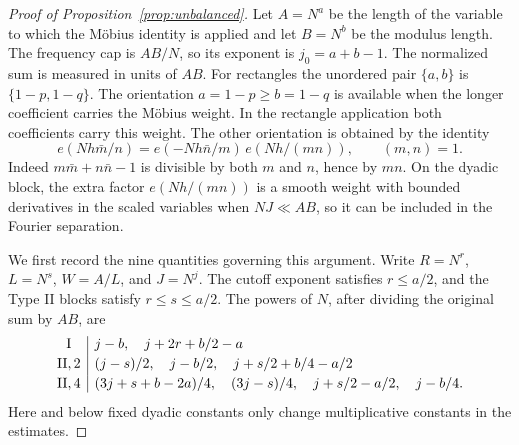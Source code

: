 \documentclass[11pt]{amsart}
\numberwithin{equation}{section}
\theoremstyle{remark}
\begin{document}
\begin{proof}[Proof of Proposition~\ref{prop:unbalanced}]
Let \(A=N^a\) be the length of the variable to which the M\"obius
identity is applied and let \(B=N^b\) be the modulus length. The
frequency cap is \(AB/N\), so its exponent is \(j_0=a+b-1\).
The normalized sum is measured in units of \(AB\).
For rectangles the unordered pair \(\{a,b\}\) is
\(\{1-p,1-q\}\). The orientation \(a=1-p\ge b=1-q\) is available
when the longer coefficient carries the M\"obius weight. In the
rectangle application both coefficients carry this weight.
The other orientation is obtained by the identity
\[
 e(Nh\bar m/n)=e(-Nh\bar n/m)\,e(Nh/(mn)),\qquad (m,n)=1.
\]
Indeed \(m\bar m+n\bar n-1\) is divisible by both \(m\) and \(n\),
hence by \(mn\). On the dyadic block, the extra factor \(e(Nh/(mn))\)
is a smooth weight with bounded derivatives in the scaled variables
when \(NJ\ll AB\), so it can be included in the Fourier separation.

We first record the nine quantities governing this argument. Write
\(R=N^r\), \(L=N^s\), \(W=A/L\), and \(J=N^j\).
The cutoff exponent satisfies \(r\le a/2\), and the Type II blocks
satisfy \(r\le s\le a/2\).
The powers of \(N\), after dividing the original sum by \(AB\), are
\begin{equation}
\begin{array}{@{}c|l@{}}
 \mathrm{I}
 & j-b,\quad j+2r+b/2-a\\[2pt]
 \mathrm{II},2
 & (j-s)/2,\quad j-b/2,\quad j+s/2+b/4-a/2\\[2pt]
 \mathrm{II},4
 & (3j+s+b-2a)/4,\quad (3j-s)/4,\quad
          j+s/2-a/2,\quad j-b/4 .
\end{array}
\label{eq:target-unbalanced-rows}
\end{equation}
Here and below fixed dyadic constants only change multiplicative
constants in the estimates.


\end{proof}
\end{document}
